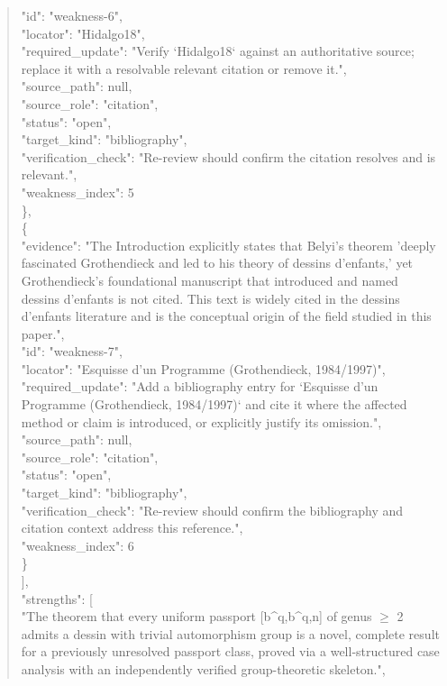 \documentclass[11pt]{article}
\begin{document}
\begin{quote}
      "id": "weakness-6",\\
      "locator": "Hidalgo18",\\
      "required\_update": "Verify `Hidalgo18` against an authoritative source; replace it with a resolvable relevant citation or remove it.",\\
      "source\_path": null,\\
      "source\_role": "citation",\\
      "status": "open",\\
      "target\_kind": "bibliography",\\
      "verification\_check": "Re-review should confirm the citation resolves and is relevant.",\\
      "weakness\_index": 5\\
    \},\\
    \{\\
      "evidence": "The Introduction explicitly states that Belyi's theorem 'deeply fascinated Grothendieck and led to his theory of dessins d'enfants,' yet Grothendieck's foundational manuscript that introduced and named dessins d'enfants is not cited. This text is widely cited in the dessins d'enfants literature and is the conceptual origin of the field studied in this paper.",\\
      "id": "weakness-7",\\
      "locator": "Esquisse d'un Programme (Grothendieck, 1984/1997)",\\
      "required\_update": "Add a bibliography entry for `Esquisse d'un Programme (Grothendieck, 1984/1997)` and cite it where the affected method or claim is introduced, or explicitly justify its omission.",\\
      "source\_path": null,\\
      "source\_role": "citation",\\
      "status": "open",\\
      "target\_kind": "bibliography",\\
      "verification\_check": "Re-review should confirm the bibliography and citation context address this reference.",\\
      "weakness\_index": 6\\
    \}\\
  ],\\
  "strengths": [\\
    "The theorem that every uniform passport [b\^{}q,b\^{}q,n] of genus \ensuremath{\ge} 2 admits a dessin with trivial automorphism group is a novel, complete result for a previously unresolved passport class, proved via a well-structured case analysis with an independently verified group-theoretic skeleton.",\\

\end{quote}
\end{document}
